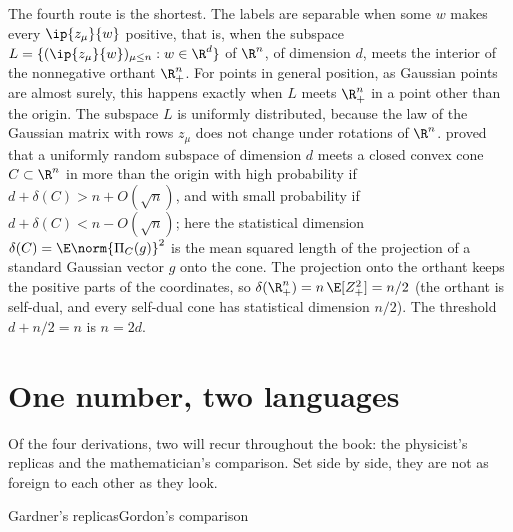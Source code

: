 \begin{refsection}
The fourth route is the shortest. The labels are separable when some $w$ makes every $\ip{z_\mu}{w}$ positive, that is, when the subspace $L=\{(\ip{z_\mu}{w})_{\mu\le n}:w\in\R^d\}$ of $\R^n$, of dimension $d$, meets the interior of the nonnegative orthant $\R^n_+$. For points in general position, as Gaussian points are almost surely, this happens exactly when $L$ meets $\R^n_+$ in a point other than the origin. The subspace $L$ is uniformly distributed, because the law of the Gaussian matrix with rows $z_\mu$ does not change under rotations of $\R^n$. \textcite{AmelunxenEtAl2014} proved that a uniformly random subspace of dimension $d$ meets a closed convex cone $C\subset\R^n$ in more than the origin with high probability if $d+\delta(C)>n+O(\sqrt n)$, and with small probability if $d+\delta(C)<n-O(\sqrt n)$; here the statistical dimension $\delta(C)=\E\norm{\Pi_C(g)}^2$ is the mean squared length of the projection of a standard Gaussian vector $g$ onto the cone. The projection onto the orthant keeps the positive parts of the coordinates, so $\delta(\R^n_+)=n\,\E[Z_+^2]=n/2$ (the orthant is self-dual, and every self-dual cone has statistical dimension $n/2$). The threshold $d+n/2=n$ is $n=2d$.

\section*{One number, two languages}

Of the four derivations, two will recur throughout the book: the physicist's replicas and the mathematician's comparison. Set side by side, they are not as foreign to each other as they look.

\begin{stone}{Gardner's replicas}{Gordon's comparison}
\end{stone}


\end{refsection}
